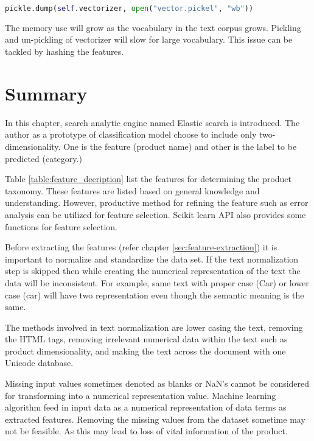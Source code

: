 \begin{lstlisting}[language=Python,label=pickle, caption={Pickle vectorization}]
    pickle.dump(self.vectorizer, open("vector.pickel", "wb"))
\end{lstlisting}

The memory use will grow as the vocabulary in the text corpus grows.  Pickling and un-pickling of vectorizer will slow for large vocabulary.
This issue can be tackled by hashing the features. 

\section{Summary}

In this chapter, search analytic engine named Elastic search is introduced. The author as a prototype of classification model choose to include only two-dimensionality. One is the feature (product name) and other is the label to be predicted (category.)

Table \ref{table:feature_decription} list the features for determining the product taxonomy. These features are listed based on general knowledge and understanding. However, productive method for refining the feature such as error analysis can be utilized for feature selection. Scikit learn API \parencite{sklearn_api} also provides some functions for feature selection.

Before extracting the features (refer chapter \ref{sec:feature-extraction}) it is important to normalize and standardize the data set. If the text normalization step is skipped then while creating the numerical representation of the text the data will be inconsistent. For example, same text with proper case (Car) or lower case (car) will have two representation even though the semantic meaning is the same.  

The methods involved in text normalization are lower casing the text, removing the HTML tags, removing irrelevant numerical data within the text such as product dimensionality, and making the text across the document with one Unicode database.

Missing input values sometimes denoted as blanks or NaN's cannot be considered for transforming into a numerical representation value. Machine learning algorithm feed in input data as a numerical representation of data terms as extracted features. Removing the missing values from the dataset sometime may not be feasible. As this may lead to loss of vital information of the product. 

